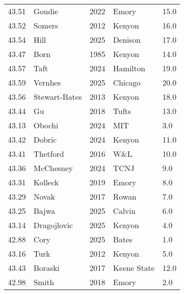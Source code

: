 \begin{table}[H]
\begin{minipage}[t]{0.48\textwidth}
\begin{tabular}{@{}p{1.8cm}p{2.8cm}p{1.2cm}p{1.4cm}p{0.8cm}@{}}
\hline
    43.51 & Goudie & 2022 & Emory & 15.0 \\
    43.52 & Somers & 2012 & Kenyon & 16.0 \\
    43.54 & Hill & 2025 & Denison & 17.0 \\
    43.47 & Born & 1985 & Kenyon & 14.0 \\
    43.57 & Taft & 2024 & Hamilton & 19.0 \\
    43.59 & Vernhes & 2025 & Chicago & 20.0 \\
    43.56 & Stewart-Bates & 2013 & Kenyon & 18.0 \\
    43.44 & Gu & 2018 & Tufts & 13.0 \\
    43.13 & Obochi & 2024 & MIT & 3.0 \\
    43.42 & Dobric & 2024 & Kenyon & 11.0 \\
    43.41 & Thetford & 2016 & W\&L & 10.0 \\
    43.36 & McChesney & 2024 & TCNJ & 9.0 \\
    43.31 & Kolleck & 2019 & Emory & 8.0 \\
    43.29 & Novak & 2017 & Rowan & 7.0 \\
    43.25 & Bajwa & 2025 & Calvin & 6.0 \\
    43.14 & Dragojlovic & 2025 & Kenyon & 4.0 \\
    42.88 & Cory & 2025 & Bates & 1.0 \\
    43.16 & Turk & 2012 & Kenyon & 5.0 \\
    43.43 & Boraski & 2017 & Keene State & 12.0 \\
    42.98 & Smith & 2018 & Emory & 2.0 \\
\hline
\end{tabular}
\end{minipage}
\end{table}

